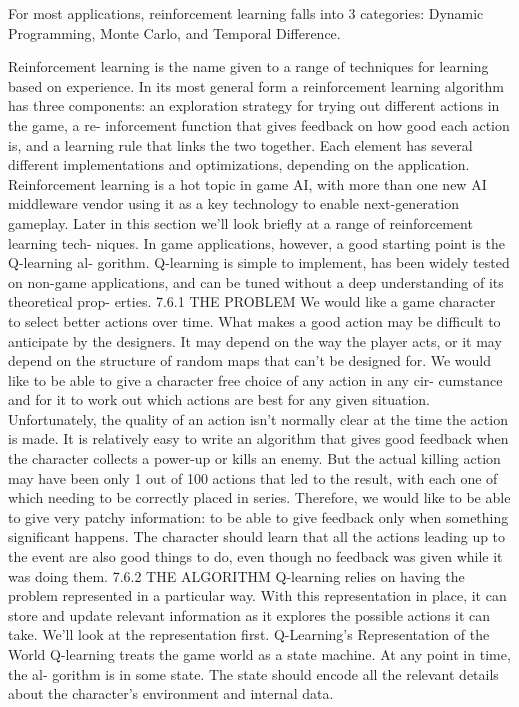 \documentclass[a4paper,oneside]{report}
\begin{document}
For most applications, reinforcement learning falls into 3 categories: Dynamic Programming, Monte Carlo, and Temporal Difference.


Reinforcement learning is the name given to a range of techniques for learning based on experience. In its most general form a reinforcement learning algorithm has three components: an exploration strategy for trying out different actions in the game, a re- inforcement function that gives feedback on how good each action is, and a learning rule that links the two together. Each element has several different implementations and optimizations, depending on the application.
Reinforcement learning is a hot topic in game AI, with more than one new AI middleware vendor using it as a key technology to enable next-generation gameplay.
Later in this section we’ll look briefly at a range of reinforcement learning tech- niques. In game applications, however, a good starting point is the Q-learning al- gorithm. Q-learning is simple to implement, has been widely tested on non-game applications, and can be tuned without a deep understanding of its theoretical prop- erties.
7.6.1 THE PROBLEM
We would like a game character to select better actions over time. What makes a good action may be difficult to anticipate by the designers. It may depend on the way the player acts, or it may depend on the structure of random maps that can’t be designed for.
We would like to be able to give a character free choice of any action in any cir- cumstance and for it to work out which actions are best for any given situation.
Unfortunately, the quality of an action isn’t normally clear at the time the action is made. It is relatively easy to write an algorithm that gives good feedback when the character collects a power-up or kills an enemy. But the actual killing action may have been only 1 out of 100 actions that led to the result, with each one of which needing to be correctly placed in series.
Therefore, we would like to be able to give very patchy information: to be able to give feedback only when something significant happens. The character should learn that all the actions leading up to the event are also good things to do, even though no feedback was given while it was doing them.
7.6.2 THE ALGORITHM
Q-learning relies on having the problem represented in a particular way. With this representation in place, it can store and update relevant information as it explores the possible actions it can take. We’ll look at the representation first.
Q-Learning’s Representation of the World
Q-learning treats the game world as a state machine. At any point in time, the al- gorithm is in some state. The state should encode all the relevant details about the character’s environment and internal data.
\end{document}
